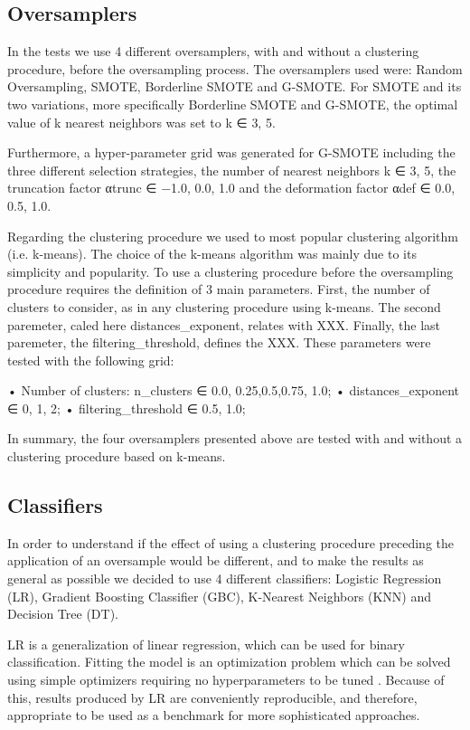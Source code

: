 \documentclass[parskip=full]{scrartcl}
\begin{document}
\subsection{Oversamplers}

In the tests we use 4 different oversamplers, with and without a clustering 
procedure, before the oversampling process. The oversamplers used were: Random 
Oversampling, SMOTE, Borderline SMOTE and G-SMOTE. For SMOTE and its two 
variations, more specifically Borderline SMOTE and G-SMOTE, the optimal value 
of k nearest neighbors was set to k ∈ {3, 5}. 

Furthermore, a hyper-parameter grid was generated for G-SMOTE including the 
three different selection strategies, the number of nearest neighbors k ∈ {3, 
5}, the truncation factor αtrunc ∈ {−1.0, 0.0, 1.0} and the deformation factor 
αdef ∈ {0.0, 0.5, 1.0}. 

Regarding the clustering procedure we used to most popular clustering algorithm 
(i.e. k-means). The choice of the k-means algorithm was mainly due to its 
simplicity and popularity. To use a clustering procedure before the 
oversampling procedure requires the definition of 3 main parameters. First, the 
number of clusters to consider, as in any clustering procedure using k-means. 
The second paremeter, caled here distances_exponent, relates with XXX. Finally, 
the last paremeter, the filtering_threshold, defines the XXX. These parameters 
were tested with the following grid:

•	Number of clusters: n_clusters ∈ {0.0, 0.25,0.5,0.75, 1.0};
•	distances_exponent ∈ {0, 1, 2};
•	filtering_threshold ∈ {0.5, 1.0};

In summary, the four oversamplers presented above are tested with and without a 
clustering procedure based on k-means.

\subsection{Classifiers}

In order to understand if the effect of using a clustering procedure preceding 
the application of an oversample would be different, and to make the results as 
general as possible we decided to use 4 different classifiers: Logistic 
Regression (LR), Gradient Boosting Classifier (GBC), K-Nearest Neighbors (KNN) 
and Decision Tree (DT). 

LR is a generalization of linear regression, which can be used for binary 
classification. Fitting the model is an optimization problem which can be 
solved using simple optimizers requiring no hyperparameters to be tuned 
\cite{McCullagh1989}. Because of this, results produced by LR are conveniently 
reproducible, and therefore, appropriate to be used as a benchmark for more 
sophisticated approaches.
\end{document}
